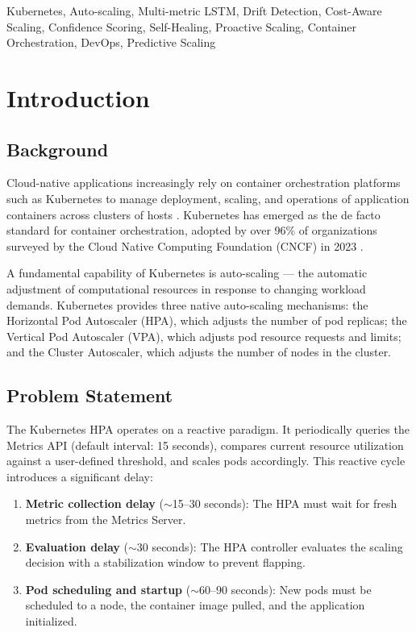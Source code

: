 \documentclass[journal]{IEEEtran}
\begin{document}
\begin{IEEEkeywords}
Kubernetes, Auto-scaling, Multi-metric LSTM, Drift Detection, Cost-Aware Scaling, Confidence Scoring, Self-Healing, Proactive Scaling, Container Orchestration, DevOps, Predictive Scaling
\end{IEEEkeywords}

\section{Introduction}

\subsection{Background}
Cloud-native applications increasingly rely on container orchestration platforms such as Kubernetes to manage deployment, scaling, and operations of application containers across clusters of hosts \cite{burns2016}. Kubernetes has emerged as the de facto standard for container orchestration, adopted by over 96\% of organizations surveyed by the Cloud Native Computing Foundation (CNCF) in 2023 \cite{cncf2023}.

A fundamental capability of Kubernetes is auto-scaling --- the automatic adjustment of computational resources in response to changing workload demands. Kubernetes provides three native auto-scaling mechanisms: the Horizontal Pod Autoscaler (HPA), which adjusts the number of pod replicas; the Vertical Pod Autoscaler (VPA), which adjusts pod resource requests and limits; and the Cluster Autoscaler, which adjusts the number of nodes in the cluster.

\subsection{Problem Statement}
The Kubernetes HPA operates on a reactive paradigm. It periodically queries the Metrics API (default interval: 15 seconds), compares current resource utilization against a user-defined threshold, and scales pods accordingly. This reactive cycle introduces a significant delay:

\begin{enumerate}
    \item \textbf{Metric collection delay} ($\sim$15--30 seconds): The HPA must wait for fresh metrics from the Metrics Server.
    \item \textbf{Evaluation delay} ($\sim$30 seconds): The HPA controller evaluates the scaling decision with a stabilization window to prevent flapping.
    \item \textbf{Pod scheduling and startup} ($\sim$60--90 seconds): New pods must be scheduled to a node, the container image pulled, and the application initialized.
\end{enumerate}
\end{document}
